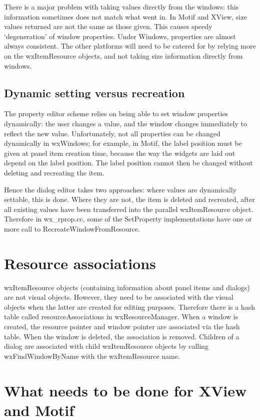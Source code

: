 There is a major problem with taking values directly from the windows: this
information sometimes does not match what went in. In Motif and XView,
size values returned are not the same as those given. This causes speedy
`degeneration' of window properties. Under Windows, properties are almost
always consistent. The other platforms will need to be catered for by
relying more on the wxItemResource objects, and not taking size
information directly from windows.

\subsection{Dynamic setting versus recreation}

The property editor scheme relies on being able to set window properties
dynamically: the user changes a value, and the window changes immediately
to reflect the new value. Unfortunately, not all properties can be
changed dynamically in wxWindows; for example, in Motif, the label position
must be given at panel item creation time, because the way the widgets
are laid out depend on the label position. The label position cannot then
be changed without deleting and recreating the item.

Hence the dialog editor takes two approaches: where values are dynamically
settable, this is done. Where they are not, the item is deleted and recreated,
after all existing values have been transferred into the parallel wxItemResource
object. Therefore in wx\_rprop.cc, some of the SetProperty implementations have one or
more call to RecreateWindowFromResource.

\section{Resource associations}

wxItemResource objects (containing information about panel items and dialogs) are not visual
objects. However, they need to be associated with the visual objects when the latter
are created for editing purposes. Therefore there is a hash table called resourceAssociations
in wxResourceManager. When a window is created, the resource pointer and window pointer
are associated via the hash table. When the window is deleted, the association is removed.
Children of a dialog are associated with child wxItemResource objects by calling
wxFindWindowByName with the wxItemResource name.

\section{What needs to be done for XView and Motif}

